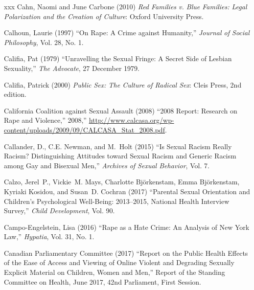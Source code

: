 \documentclass[]{jlreq} \usepackage{mystyle}
\begin{document}
\begin{thebibliography}{xxx}
Cahn, Naomi and June Carbone (2010)  \textit{ Red Families v. Blue Families:
  Legal Polarization and the Creation of Culture}: Oxford University Press.

Calhoun, Laurie (1997) ``On Rape: A Crime against Humanity,'' \textit{ Journal
  of Social Philosophy}, Vol. 28, No. 1.

Califia, Pat (1979) ``Unravelling the Sexual Fringe: A Secret Side of Lesbian
  Sexuality,'' \emph{The Advocate}, 27 December 1979.

Califia, Patrick (2000)  \textit{ Public Sex: The Culture of Radical Sex}:
  Cleis Press, 2nd edition.

{California Coalition against Sexual Assault} (2008) ``2008 Report: Research on
  Rape and Violence,” 2008,''
  \url{http://www.calcasa.org/wp-content/uploads/2009/09/CALCASA_Stat_2008.pdf}.

Callander, D., C.E. Newman, and M.~Holt (2015) ``Is Sexual Racism Really
  Racism? Distinguishing Attitudes toward Sexual Racism and Generic Racism
  among Gay and Bisexual Men,'' \textit{ Archives of Sexual Behavior}, Vol. 7.

Calzo, Jerel~P., Vickie~M. Mays, Charlotte Björkenstam, Emma Björkenstam,
  Kyriaki Kosidou, and Susan~D. Cochran (2017) ``Parental Sexual Orientation
  and Children's Psychological Well-Being: 2013--2015, National Health
  Interview Survey,'' \textit{ Child Development}, Vol. 90.

Campo-Engelstein, Lisa (2016) ``Rape as a Hate Crime: An Analysis of New York
  Law,'' \textit{ Hypatia}, Vol. 31, No. 1.

{Canadian Parliamentary Committee} (2017) ``Report on the Public Health Effects
  of the Ease of Access and Viewing of Online Violent and Degrading Sexually
  Explicit Material on Children, Women and Men,'' Report of the Standing
  Committee on Health, June 2017, 42nd Parliament, First Session.


\end{thebibliography}
\end{document}
